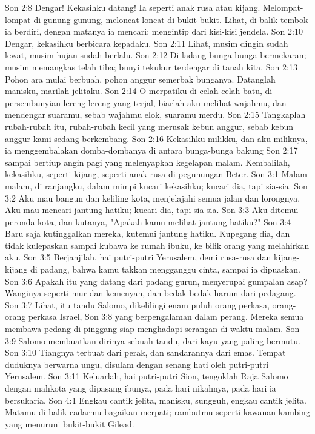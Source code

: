 Son 2:8  Dengar! Kekasihku datang! Ia seperti anak rusa atau kijang. Melompat-lompat di gunung-gunung, meloncat-loncat di bukit-bukit. Lihat, di balik tembok ia berdiri, dengan matanya ia mencari; mengintip dari kisi-kisi jendela.
Son 2:10  Dengar, kekasihku berbicara kepadaku.
Son 2:11  Lihat, musim dingin sudah lewat, musim hujan sudah berlalu.
Son 2:12  Di ladang bunga-bunga bermekaran; musim memangkas telah tiba; bunyi tekukur terdengar di tanah kita.
Son 2:13  Pohon ara mulai berbuah, pohon anggur semerbak bunganya. Datanglah manisku, marilah jelitaku.
Son 2:14  O merpatiku di celah-celah batu, di persembunyian lereng-lereng yang terjal, biarlah aku melihat wajahmu, dan mendengar suaramu, sebab wajahmu elok, suaramu merdu.
Son 2:15  Tangkaplah rubah-rubah itu, rubah-rubah kecil yang merusak kebun anggur, sebab kebun anggur kami sedang berkembang.
Son 2:16  Kekasihku milikku, dan aku miliknya, ia menggembalakan domba-dombanya di antara bunga-bunga bakung
Son 2:17  sampai bertiup angin pagi yang melenyapkan kegelapan malam. Kembalilah, kekasihku, seperti kijang, seperti anak rusa di pegunungan Beter.
Son 3:1  Malam-malam, di ranjangku, dalam mimpi kucari kekasihku; kucari dia, tapi sia-sia.
Son 3:2  Aku mau bangun dan keliling kota, menjelajahi semua jalan dan lorongnya. Aku mau mencari jantung hatiku; kucari dia, tapi sia-sia.
Son 3:3  Aku ditemui peronda kota, dan kutanya, "Apakah kamu melihat jantung hatiku?"
Son 3:4  Baru saja kutinggalkan mereka, kutemui jantung hatiku. Kupegang dia, dan tidak kulepaskan sampai kubawa ke rumah ibuku, ke bilik orang yang melahirkan aku.
Son 3:5  Berjanjilah, hai putri-putri Yerusalem, demi rusa-rusa dan kijang-kijang di padang, bahwa kamu takkan mengganggu cinta, sampai ia dipuaskan.
Son 3:6  Apakah itu yang datang dari padang gurun, menyerupai gumpalan asap? Wanginya seperti mur dan kemenyan, dan bedak-bedak harum dari pedagang.
Son 3:7  Lihat, itu tandu Salomo, dikelilingi enam puluh orang perkasa, orang-orang perkasa Israel,
Son 3:8  yang berpengalaman dalam perang. Mereka semua membawa pedang di pinggang siap menghadapi serangan di waktu malam.
Son 3:9  Salomo membuatkan dirinya sebuah tandu, dari kayu yang paling bermutu.
Son 3:10  Tiangnya terbuat dari perak, dan sandarannya dari emas. Tempat duduknya berwarna ungu, disulam dengan senang hati oleh putri-putri Yerusalem.
Son 3:11  Keluarlah, hai putri-putri Sion, tengoklah Raja Salomo dengan mahkota yang dipasang ibunya, pada hari nikahnya, pada hari ia bersukaria.
Son 4:1  Engkau cantik jelita, manisku, sungguh, engkau cantik jelita. Matamu di balik cadarmu bagaikan merpati; rambutmu seperti kawanan kambing yang menuruni bukit-bukit Gilead.
